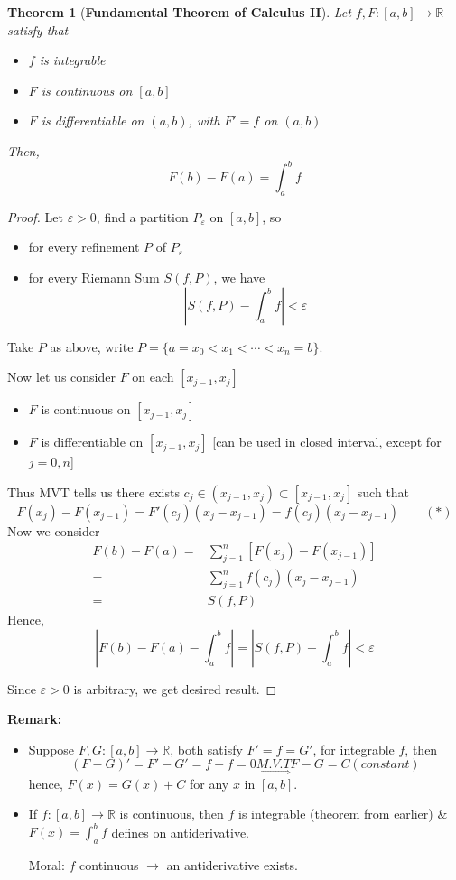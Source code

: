 \documentclass[12pt]{article}
\theoremstyle{plain}
\newtheorem{theorem}{Theorem}[subsection]
\newcommand{\abs}[1]{\left| #1 \right|}
\newcommand{\mR}{{\mathbb{R}}}
\newcommand{\ep}{\varepsilon}
\begin{document}
	\begin{theorem}[\textbf{Fundamental Theorem of Calculus II}]
		Let $f, F : [a,b] \to \mR$ satisfy that 
		\begin{itemize}
			\item $f$ is integrable
			\item $F$ is continuous on $[a,b]$ 
			\item $F$ is differentiable on $(a,b)$, with $F' = f$ on $(a,b)$
		\end{itemize}
		Then, 
		\[
			F(b) - F(a) = \int_a^b f
		\]
	\end{theorem}
	\begin{proof}
		Let $\ep>0$, find a partition $P_{\ep}$ on $[a,b]$, so 
		\begin{itemize}
			\item for every refinement $P$ of $P_{\ep}$
			\item for every Riemann Sum $S(f,P)$, we have 
				\[
					\abs{S(f,P) - \int_a^b f} < \ep
				\]
		\end{itemize}
		Take $P$ as above, write $P=\{a = x_0 < x_1 < \cdots < x_n = b\}$. 

		Now let us consider $F$ on each $[x_{j-1}, x_j]$ 
		\begin{itemize}
			\item $F$ is continuous on $[x_{j-1}, x_j]$
			\item $F$ is differentiable on $[x_{j-1}, x_j]$ [can be used in 
				closed interval, except for $j=0,n$]
		\end{itemize}
		Thus MVT tells us there exists $c_j\in(x_{j-1}, x_j) \subset [x_{j-1},
		x_j]$ such that 
		\[
			F(x_j)-F(x_{j-1}) = F'(c_j) (x_j-x_{j-1})
			=f(c_j) (x_j-x_{j-1}) \qquad (*)
		\]
		Now we consider
		\begin{align*}
			F(b) - F(a) 
			=& \sum_{j=1}^n [F(x_j) - F(x_{j-1})] \tag{telescope}\\
			=& \sum_{j=1}^n f(c_j) (x_j-x_{j-1}) \tag{by *}\\
			=& S(f,P) \tag{a Riemann Sum} 
		\end{align*}
		Hence, 
		\[
			\abs{F(b) - F(a) - \int_a^b f} = \abs{S(f,P) - \int_a^b f} < \ep
		\]
		
		Since $\ep>0$ is arbitrary, we get desired result. 
	\end{proof}

	{\color{brown}
	\textbf{Remark:}
	\begin{itemize}
		\item Suppose $F, G : [a,b] \to \mR$, both satisfy $F' = f =
	G'$, for integrable $f$, then 
	\[
		(F-G)' = F'-G' = f-f = 0 
		\underset{\Rightarrow}{M.V.T} F - G = C (constant)
	\]
	hence, $F(x) = G(x) + C$ for any $x$ in $[a,b]$. 
	
	\item 
		If $f:[a,b]\to \mR$ is continuous, then $f$ is integrable
		(theorem from earlier) $\&$ $F(x) = \int_a^b f$ defines on 
		antiderivative.

		Moral: $f$ continuous $\to$ an antiderivative exists. \\
	\end{itemize}
	}
\end{document}
